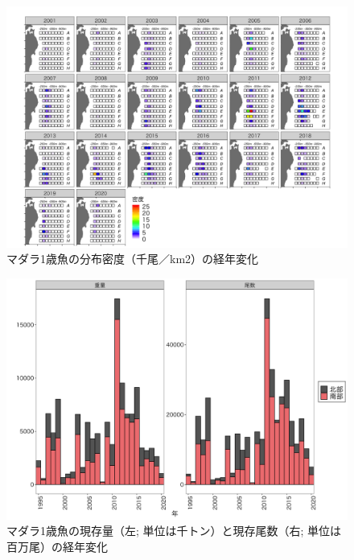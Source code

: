 \documentclass[11pt]{article} %
\begin{document}
\begin{linenumbers}
\begin{figure}[h]
  \centering
  \includegraphics[width = 14cm]{マダラ１＋dens.png}
  \caption{マダラ1歳魚の分布密度（千尾／km2）の経年変化}
\end{figure}

\begin{figure}[h]
  \centering
  \includegraphics[width = 14cm]{マダラ１＋trend.png}
  \caption{マダラ1歳魚の現存量（左; 単位は千トン）と現存尾数（右; 単位は百万尾）の経年変化}
\end{figure}


\end{linenumbers}
\end{document}

